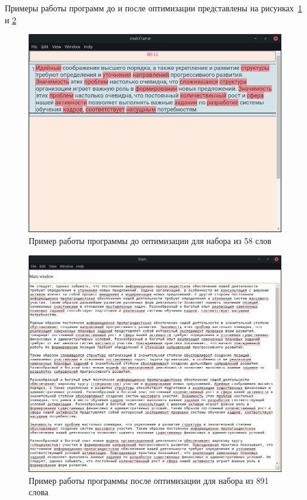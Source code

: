 Примеры работы программ до и после оптимизации представлены на рисунках~\ref{img:58_before} и \ref{img:891_after}

\begin{figure}[H]
  \centering
  \includegraphics[height=0.4\textheight]{assets/images/practical/58_before.png}
  \caption{Пример работы программы до оптимизации для набора из 58 слов}
  \label{img:58_before}
\end{figure}

\begin{figure}[H]
  \centering
  \includegraphics[height=0.4\textheight]{assets/images/practical/891_after.png}
  \caption{Пример работы программы после оптимизации для набора из 891 слова}
  \label{img:891_after}
\end{figure}

